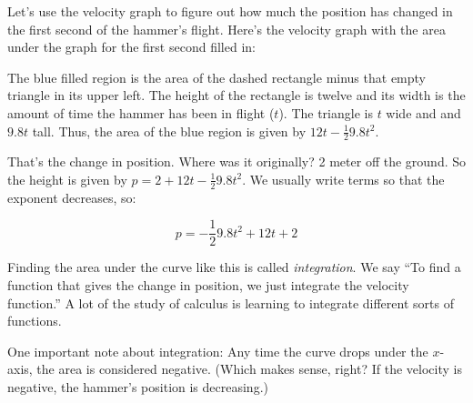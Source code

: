 Let's use the velocity graph to figure out how much the position has
changed in the first second of the hammer's flight. Here's the
velocity graph with the area under the graph for the first second filled
in:



The blue filled region is the area of the dashed rectangle minus that
empty triangle in its upper left.  The height of the rectangle is
twelve and its width is the amount of time the hammer has been in
flight ($t$).  The triangle is $t$ wide and and $9.8t$ tall. Thus, the
area of the blue region is given by $12t - \frac{1}{2}9.8 t^2$.

That's the change in position. Where was it originally? 2 meter off
the ground.  So the height is given by $p = 2 + 12t - \frac{1}{2}9.8t^2$.
We usually write terms so that the exponent decreases, so:

$$p = - \frac{1}{2}9.8t^2 + 12t + 2$$

Finding the area under the curve like this is called
\textit{integration}.  We say ``To find a function that gives the
change in position, we just integrate the velocity function.''  A lot
of the study of calculus is learning to integrate different sorts of
functions.

One important note about integration: Any time the curve drops under
the $x$-axis, the area is considered negative. (Which makes sense,
right? If the velocity is negative, the hammer's position is
decreasing.)


